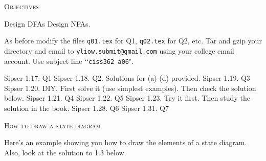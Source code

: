 

\renewcommand\AUTHOR{John Doe}


\topmatter

\textsc{Objectives}
\begin{itemize}
\li Design DFAs
\li Design NFAs.
\end{itemize}


As before modify the files
\verb!q01.tex! for Q1,
\verb!q02.tex! for Q2, etc.
Tar and gzip your directory and email to \verb!yliow.submit@gmail.com!
using your college email account.
Use subject line \lq\lq \verb!ciss362 a06!".

\begin{myenum}
\li Sipser 1.17. Q1
\li Sipser 1.18. Q2. Solutions for (a)-(d) provided.
\li Sipser 1.19. Q3
\li Sipser 1.20. DIY. First solve it (use simplest examples). Then check the solution below. 
\li Sipser 1.21. Q4
\li Sipser 1.22. Q5
\li Sipser 1.23. Try it first. Then study the solution in the book.
\li Sipser 1.28. Q6
\li Sipser 1.31. Q7

\end{myenum}

\newpage
\textsc{How to draw a state diagram}

Here's an example showing you how to draw the elements of a state diagram.
Also, look at the solution to 1.3 below.

\begin{center}
\end{center}

